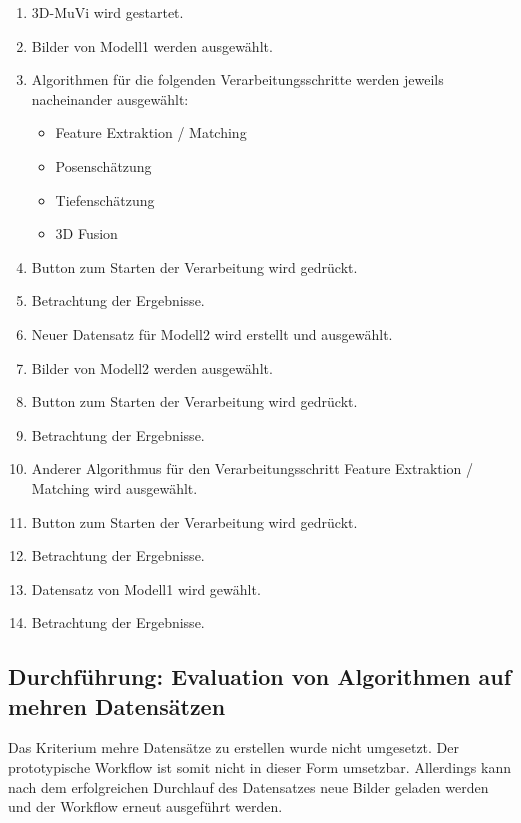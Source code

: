 \begin{enumerate}
	\item 3D-MuVi wird gestartet.
	\item \label{TNOEvalAlgoBilderAuswahl1} Bilder von Modell1 werden ausgewählt.
	\item Algorithmen für die folgenden Verarbeitungsschritte werden jeweils nacheinander ausgewählt:
	\begin{itemize}
		\item Feature Extraktion / Matching
		\item Posenschätzung
		\item Tiefenschätzung
		\item 3D Fusion
	\end{itemize}
	\item Button zum Starten der Verarbeitung wird gedrückt.
	\item Betrachtung der Ergebnisse.
	\item Neuer Datensatz für Modell2 wird erstellt und ausgewählt.
	\item Bilder von Modell2 werden ausgewählt.
	\item Button zum Starten der Verarbeitung wird gedrückt.
	\item Betrachtung der Ergebnisse.
	\item Anderer Algorithmus für den Verarbeitungsschritt Feature Extraktion / Matching wird ausgewählt.
	\item Button zum Starten der Verarbeitung wird gedrückt.
	\item Betrachtung der Ergebnisse.
	\item Datensatz von Modell1 wird gewählt.
	\item Betrachtung der Ergebnisse.
\end{enumerate}
\subsection{Durchführung: Evaluation von Algorithmen auf mehren Datensätzen}
Das Kriterium mehre Datensätze zu erstellen wurde nicht umgesetzt. Der prototypische Workflow ist somit nicht in dieser Form umsetzbar. Allerdings kann nach dem erfolgreichen Durchlauf des Datensatzes neue Bilder geladen werden und der Workflow erneut ausgeführt werden.